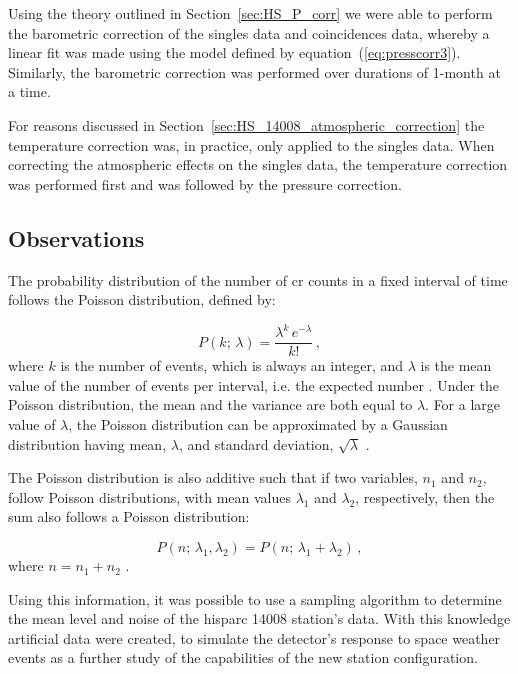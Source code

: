 Using the theory outlined in Section~\ref{sec:HS_P_corr} we were able to perform the barometric correction of the singles data and coincidences data, whereby a linear fit was made using the model defined by equation~(\ref{eq:presscorr3}). Similarly, the barometric correction was performed over durations of 1-month at a time.

For reasons discussed in Section~\ref{sec:HS_14008_atmospheric_correction} the temperature correction was, in practice, only applied to the singles data. When correcting the atmospheric effects on the singles data, the temperature correction was performed first and was followed by the pressure correction.



\subsection{Observations}\label{sec:HS_14008_method_obs}

The probability distribution of the number of \gls{cr} counts in a fixed interval of time follows the Poisson distribution, defined by:

\begin{equation}
P(k; \, \lambda) = \frac{\lambda^k \, e^{-\lambda}}{k!} \, ,
\label{eq:poisson_PDF}
\end{equation}
%
where $k$ is the number of events, which is always an integer, and $\lambda$ is the mean value of the number of events per interval, i.e. the expected number \citep{lista_statistical_2016}. Under the Poisson distribution, the mean and the variance are both equal to $\lambda$. For a large value of $\lambda$, the Poisson distribution can be approximated by a Gaussian distribution having mean, $\lambda$, and standard deviation, $\sqrt{\lambda}$ \citep{lista_statistical_2016}.

The Poisson distribution is also additive such that if two variables, $n_1$ and $n_2$, follow Poisson distributions, with mean values $\lambda_1$ and $\lambda_2$, respectively, then the sum also follows a Poisson distribution:

\begin{equation}
P(n; \, \lambda_1, \lambda_2) = P(n; \, \lambda_1 + \lambda_2) \, ,
\label{eq:poisson_additive_PDF}
\end{equation}
%
where $n = n_1 + n_2$ \citep{lista_statistical_2016}.

Using this information, it was possible to use a sampling algorithm to determine the mean level and noise of the \gls{hisparc} 14008 station's data. With this knowledge artificial data were created, to simulate the detector's response to space weather events as a further study of the capabilities of the new station configuration. 

